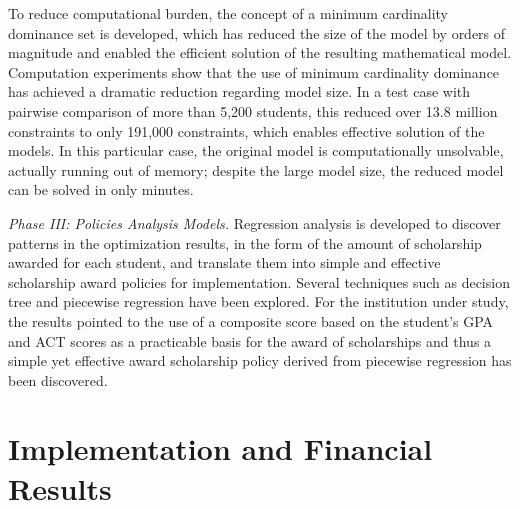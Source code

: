 \documentclass[12pt,english]{report}
\begin{document}
To reduce computational burden, the concept of a minimum cardinality 
dominance set is developed, which has reduced the size of the model by 
orders of magnitude and enabled the efficient solution of the resulting 
mathematical model. Computation experiments show that the use of minimum 
cardinality dominance has achieved a dramatic reduction regarding model 
size. In a test case with pairwise comparison of more than 5,200 students, 
this reduced over 13.8 million constraints to only 191,000 constraints, 
which enables effective solution of the models.  In this particular case,  
the original model is computationally unsolvable, actually running out of 
memory; despite the large model size, the reduced model can be solved in 
only minutes.
% 
% 

\noindent \textit{Phase III: Policies Analysis Models.} Regression analysis is developed to discover patterns in the optimization results, in the form of the amount of scholarship awarded for each student, and translate them into simple and effective scholarship award policies for implementation. Several techniques such as decision tree and piecewise regression  have been explored. For the institution under study, the results pointed to the use of a composite score based on the student's GPA and ACT scores as a practicable basis for the award of scholarships and thus a simple  yet effective award scholarship policy derived from piecewise regression has been discovered.
% 
% 
% 
% 

\section{Implementation and Financial Results}
\end{document}
